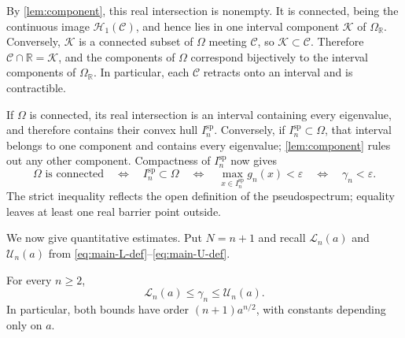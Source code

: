 \documentclass[review,hidelinks,onefignum,onetabnum]{siamart251216}
\newcommand{\R}{\mathbb R}
\begin{document}
By \cref{lem:component}, this real intersection is nonempty.  It is
connected, being the continuous image \(\mathcal H_1(\mathcal C)\), and hence
lies in one interval component \(\mathcal K\) of \(\Omega_\R\).
Conversely, \(\mathcal K\) is a
connected subset of \(\Omega\) meeting \(\mathcal C\), so
\(\mathcal K\subset\mathcal C\).  Therefore
\(\mathcal C\cap\R=\mathcal K\), and the
components of \(\Omega\) correspond bijectively to the interval
components of \(\Omega_\R\).  In particular, each \(\mathcal C\)
retracts onto
an interval and is contractible.

If \(\Omega\) is connected, its real intersection is an interval
containing every eigenvalue, and therefore contains their convex hull
\(I_n^{\mathrm{sp}}\).  Conversely, if
\(I_n^{\mathrm{sp}}\subset\Omega\), that interval belongs to one
component and contains every eigenvalue; \cref{lem:component} rules out
any other component.  Compactness of \(I_n^{\mathrm{sp}}\) now gives
\begin{equation}\label{eq:connected-iff-gamma}
 \Omega\text{ is connected}
 \quad\Longleftrightarrow\quad
 I_n^{\mathrm{sp}}\subset\Omega
 \quad\Longleftrightarrow\quad
 \max_{x\in I_n^{\mathrm{sp}}}g_n(x)<\varepsilon
 \quad\Longleftrightarrow\quad
 \gamma_n<\varepsilon.
\end{equation}
The strict inequality reflects the open definition of the
pseudospectrum; equality leaves at least one real barrier point outside.

We now give quantitative estimates.  Put \(N=n+1\) and recall
\(\mathcal L_n(a)\) and \(\mathcal U_n(a)\) from
\eqref{eq:main-L-def}--\eqref{eq:main-U-def}.

\begin{proposition}\label{prop:gap-bounds}
For every \(n\geq2\),
\begin{equation}\label{eq:gamma-LU}
 \mathcal L_n(a)\leq\gamma_n\leq\mathcal U_n(a).
\end{equation}
In particular, both bounds have order \((n+1)a^{n/2}\), with constants
depending only on \(a\).
\end{proposition}
\end{document}
